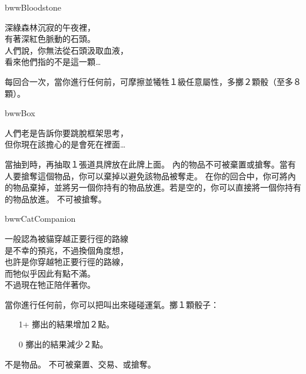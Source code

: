 %
\begin{OmenCard}{bww}{Bloodstone}{}
	\begin{CardStory}
		深綠森林沉寂的午夜裡，\\
		有著深紅色脈動的石頭。\\
		人們說，你無法從石頭汲取血液，\\
		看來他們指的不是這一顆…
	\end{CardStory}
	每回合一次，當你進行任何前，可摩擦\ThisName{}並犧牲１級任意屬性，多擲２顆骰（至多８顆）。\smallbreak
\end{OmenCard}%
\linebreak[0]%
\begin{OmenCard}{bww}{Box}{}
	\begin{CardStory}
		人們老是告訴你要跳脫框架思考，\\
		但你現在該擔心的是會死在裡面…
	\end{CardStory}
	當抽到\ThisName{}時，再抽取１張道具牌放在此牌上面。\smallbreak
	\ThisName{}內的物品不可被棄置或搶奪。當有人要搶奪這個物品，你可以棄掉\ThisName{}以避免該物品被奪走。\smallbreak
	在你的回合中，你可將\ThisName{}內的物品棄掉，並將另一個你持有的物品放進\ThisName{}。若\ThisName{}是空的，你可以直接將一個你持有的物品放進\ThisName{}。\smallbreak
	\ThisName{}不可被搶奪。\smallbreak
\end{OmenCard}%
\linebreak[0]%
\begin{OmenCard}{bww}{Cat}{Companion}
	\begin{CardStory}
		一般認為被貓穿越正要行徑的路線\\
		是不幸的預兆，不過換個角度想，\\
		也許是你穿越牠正要行徑的路線，\\
		而牠似乎因此有點不滿。\\
		不過現在牠正陪伴著你。
	\end{CardStory}
	當你進行任何前，你可以把\ThisName{}叫出來碰碰運氣。擲１顆骰子：
	\begin{itemize}
		\item[1+] 擲出的結果增加２點。
		\item[0] 擲出的結果減少２點。
	\end{itemize}
	\ThisName{}不是物品。\smallbreak
	\ThisName{}不可被棄置、交易、或搶奪。\smallbreak
\end{OmenCard}%
\linebreak[0]%
